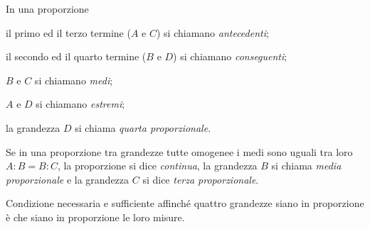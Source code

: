 \begin{definizione}
In una proporzione
\begin{itemize*}
\item il primo ed il terzo termine ($A$ e $C$) si chiamano 
\emph{antecedenti};
\item il secondo ed il quarto termine ($B$ e $D$) si chiamano 
\emph{conseguenti};
\item $B$ e $C$ si chiamano \emph{medi};
\item $A$ e $D$ si chiamano \emph{estremi};
\item la grandezza $D$ si chiama \emph{quarta proporzionale}.
\end{itemize*}
\end{definizione}

\begin{definizione}
Se in una proporzione tra grandezze tutte omogenee i medi sono uguali 
tra loro $A : B = B : C$, la proporzione si dice \emph{continua}, la 
grandezza $B$ si chiama \emph{media proporzionale} e la grandezza $C$ 
si dice \emph{terza proporzionale}.
\end{definizione}

\begin{teorema}\label{teo:fond_prop}
Condizione necessaria e sufficiente affinché quattro grandezze siano 
in proporzione è che siano in proporzione le loro misure.
\end{teorema}

